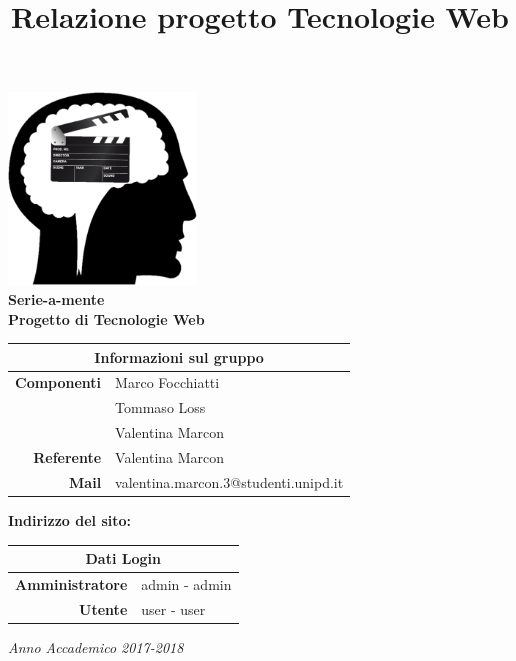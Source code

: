 \documentclass{tecweb}
\title{Relazione progetto Tecnologie Web}
\begin{document}
	\begin{titlepage}
		\begin{center}
			\includegraphics[width=5cm]{Logo2}
			\vspace{0.5cm}	\\
			\Huge \textbf{Serie-a-mente}
			\vspace{0.5cm}\\
			\normalsize \textbf{Progetto di Tecnologie Web}
			\vspace{0.7cm}	\\
			\renewcommand\arraystretch{1.3}	
			\begin{tabularx}{11cm}{r|X}
				\multicolumn{2}{c}{\textbf{Informazioni sul gruppo}}\\ 
				\hline
				\textbf{Componenti} & Marco Focchiatti \\ & Tommaso Loss \\ & Valentina Marcon \\  
				\textbf{Referente} & Valentina Marcon \\ 
				\textbf{Mail} & valentina.marcon.3@studenti.unipd.it \\
			\end{tabularx}
			\vspace{0.7cm}
			\textbf{Indirizzo del sito:}
			\vspace{0.7cm}	\\
			\begin{tabularx}{11cm}{r|X}
				\multicolumn{2}{c}{\textbf{Dati Login}}\\ 
				\hline
				\textbf{Amministratore} & admin - admin \\
				\textbf{Utente} & user - user
			\end{tabularx}
		\vspace{2cm}
		\textit{Anno Accademico 2017-2018}
			
		\end{center}
	\end{titlepage}
	\tableofcontents
	\newpage
\end{document}
